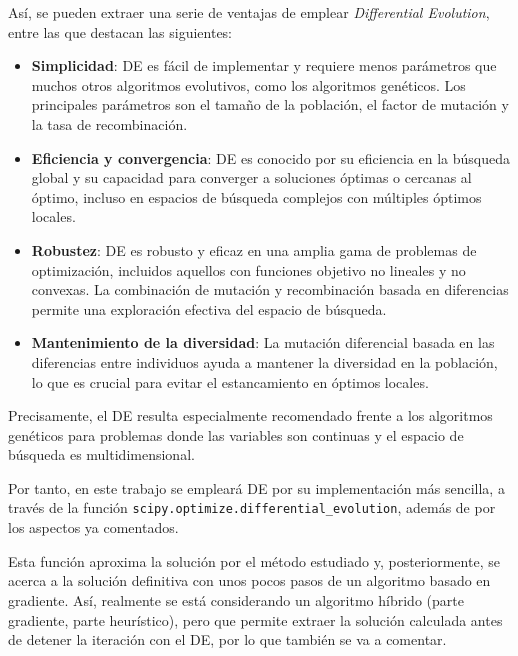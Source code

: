 Así, se pueden extraer una serie de ventajas de emplear \textit{Differential Evolution}, entre las que destacan las siguientes:

\begin{itemize}
    \item \textbf{Simplicidad}: DE es fácil de implementar y requiere menos parámetros que muchos otros algoritmos evolutivos, como los algoritmos genéticos. Los principales parámetros son el tamaño de la población, el factor de mutación y la tasa de recombinación.

    \item \textbf{Eficiencia y convergencia}: DE es conocido por su eficiencia en la búsqueda global y su capacidad para converger a soluciones óptimas o cercanas al óptimo, incluso en espacios de búsqueda complejos con múltiples óptimos locales.

    \item \textbf{Robustez}: DE es robusto y eficaz en una amplia gama de problemas de optimización, incluidos aquellos con funciones objetivo no lineales y no convexas. La combinación de mutación y recombinación basada en diferencias permite una exploración efectiva del espacio de búsqueda.

    \item \textbf{Mantenimiento de la diversidad}: La mutación diferencial basada en las diferencias entre individuos ayuda a mantener la diversidad en la población, lo que es crucial para evitar el estancamiento en óptimos locales.
\end{itemize}

Precisamente, el DE resulta especialmente recomendado frente a los algoritmos genéticos para problemas donde las variables son continuas y el espacio de búsqueda es multidimensional.

Por tanto, en este trabajo se empleará DE por su implementación más sencilla, a través de la función \texttt{scipy.optimize.differential_evolution}\cite{2020SciPy-NMeth}, además de por los aspectos ya comentados. 

Esta función aproxima la solución por el método estudiado y, posteriormente, se acerca a la solución definitiva con unos pocos pasos de un algoritmo basado en gradiente. Así, realmente se está considerando un algoritmo híbrido (parte gradiente, parte heurístico), pero que permite extraer la solución calculada antes de detener la iteración con el DE, por lo que también se va a comentar.


